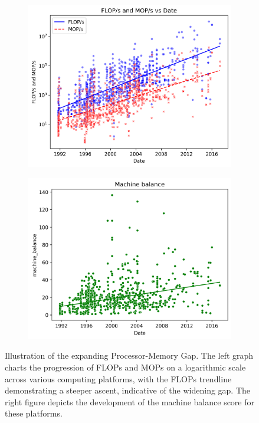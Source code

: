 \begin{figure}
	\begin{subfigure}{.5\textwidth}
		\centering
		\includegraphics[width=.9\linewidth]{pictures/FLOPs_MOPs_vs_Date.png}
	\end{subfigure}
	\begin{subfigure}{.5\textwidth}
		\centering
		\includegraphics[width=.9\linewidth]{pictures/machine_balance.png}
	\end{subfigure}
	\caption{Illustration of the expanding Processor-Memory Gap. The left graph charts the progression of FLOPs and MOPs on a logarithmic scale across various computing platforms, with the FLOPs trendline demonstrating a steeper ascent, indicative of the widening gap. The right figure depicts the development of the machine balance score for these platforms.\protect\footnotemark{}}
	\label{fig:pmgap}
\end{figure}


